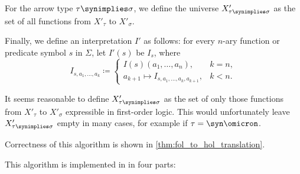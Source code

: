 \begin{algorithm}
\begin{thmenum}
\begin{thmenum}
\begin{thmenum}
         For the arrow type \( \tau \synimplies \sigma \), we define the universe \( X'_{\tau \synimplies \sigma} \) as the set of all functions from \( X'_\tau \) to \( X'_\sigma \).
      \end{thmenum}

       Finally, we define an interpretation \( I' \) as follows: for every \( n \)-ary function or predicate symbol \( s \) in \( \Sigma \), let \( I'(s) \) be \( I_s \), where
      \begin{equation*}
        I_{s,a_1,\ldots,a_k} \coloneqq \begin{cases}
          I(s)(a_1, \ldots, a_n),                       &k = n, \\
          a_{k+1} \mapsto I_{s,a_1,\ldots,a_k,a_{k+1}}, &k < n.
        \end{cases}
      \end{equation*}
    \end{thmenum}
  \end{thmenum}
\end{algorithm}
\begin{comments}
  \item It seems reasonable to define \( X'_{\tau \synimplies \sigma} \) as the set of only those functions from \( X'_\tau \) to \( X'_\sigma \) expressible in first-order logic. This would unfortunately leave \( X'_{\tau \synimplies \sigma} \) empty in many cases, for example if \( \tau = \syn\omicron \).

  \item Correctness of this algorithm is shown in \cref{thm:fol_to_hol_translation}.

  \item This algorithm is implemented in \cite{notebook:code} in four parts:
  \begin{CodeRefDisplay}
     \\
     \\
     \\
  \end{CodeRefDisplay}
\end{comments}

